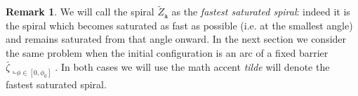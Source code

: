 \documentclass[reqno]{amsart}
\newcounter{assu}
\theoremstyle{definition} \newtheorem{definition}{Definition}[section]
\theoremstyle{definition} \newtheorem{remark}[definition]{Remark}
\theoremstyle{plain} \newtheorem{lemma}[definition]{Lemma}
\theoremstyle{plain} \newtheorem{proposition}[definition]{Proposition}
\theoremstyle{plain} \newtheorem{theorem}[definition]{Theorem}
\theoremstyle{plain} \newtheorem{corollary}[definition]{Corollary}
\theoremstyle{definition} \newtheorem{example}[definition]{Example}
\theoremstyle{plain} \newtheorem{claim}[clai]{Claim}
\theoremstyle{definition} \newtheorem{assumption}[definition]{Assumption}
\theoremstyle{definition} \newtheorem{observation}[definition]{Observation}
\newcommand{\1}{\mathbbm 1}
\newcommand{\rest}{\llcorner}
\numberwithin{equation}{section} %
\theoremstyle{plain} \newtheorem*{theorem*}{Theorem}
\theoremstyle{plain} \newtheorem{mthm}[maintheorem]{Main Theorem}
\theoremstyle{plain} \newtheorem*{mthm*}{Main Theorem}
\theoremstyle{plain} \newtheorem*{conjecture*}{Conjecture}
\theoremstyle{plain} \newtheorem{conjecture}[definition]{Conjecture}
\theoremstyle{plain} \newtheorem*{problem*}{Problem}
\begin{document}
\begin{remark}
\label{Rem:notation}
We will call the spiral $\tilde Z_\mathtt a$ as the \emph{fastest saturated spiral}: indeed it is the spiral which becomes saturated as fast as possible (i.e. at the smallest angle) and remains saturated from that angle onward. In the next section we consider the same problem when the initial configuration is an arc of a fixed barrier $\bar \zeta \rest_{\phi \in [0,\phi_0]}$. In both cases we will use the math accent \emph{tilde} will denote the fastest saturated spiral.
\end{remark}
%
%
%
\end{document}
